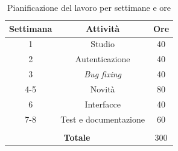 \renewcommand{\arraystretch}{1.3}
\begin{table}[H]
    \centering
        \begin{tabular}{| c | c | c |} 
        \hline
        \textbf{Settimana} & \textbf{Attività} & \textbf{Ore} \\
        \hline
        1 & Studio & 40 \\ 
        \hline
        2 & Autenticazione & 40 \\
        \hline
        3 & \emph{Bug fixing} & 40 \\
        \hline
        4-5 & Novità & 80 \\
        \hline
        6 & Interfacce & 40 \\
        \hline
        7-8 & Test e documentazione & 60 \\
        \hline
        \multicolumn{3}{c}{\rule{0pt}{1em}} \\
        \hline
        \multicolumn{2}{|c|}{\textbf{Totale}} & 300 \\
        \hline
        \end{tabular}
        \caption{Pianificazione del lavoro per settimane e ore}
\end{table}
\renewcommand{\arraystretch}{1}